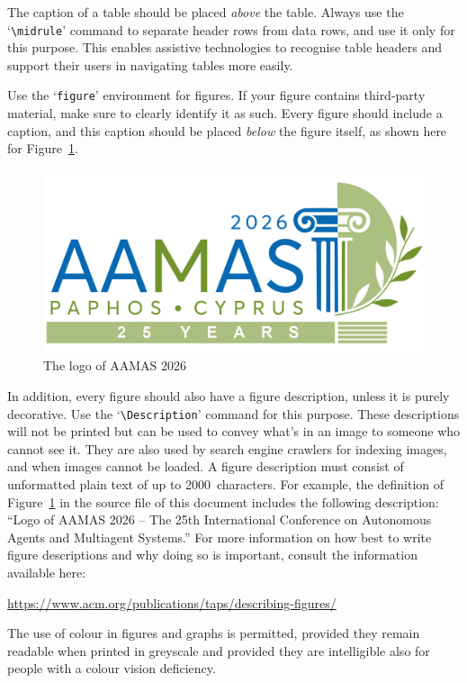 \documentclass[sigconf,anonymous]{aamas}
\begin{document}
The caption of a table should be placed \emph{above} the table. 
Always use the `\verb|\midrule|' command to separate header rows from 
data rows, and use it only for this purpose. This enables assistive 
technologies to recognise table headers and support their users in 
navigating tables more easily.

\balance

Use the `\texttt{figure}' environment for figures. If your figure 
contains third-party material, make sure to clearly identify it as such.
Every figure should include a caption, and this caption should be placed 
\emph{below} the figure itself, as shown here for Figure~\ref{fig:logo}.

\begin{figure}[h]
  \centering
  \includegraphics[width=0.75\linewidth]{aamas2026logo}
  \caption{The logo of AAMAS 2026}
  \label{fig:logo}
\end{figure}

In addition, every figure should also have a figure description, unless
it is purely decorative. Use the `\verb|\Description|' command for this 
purpose. These descriptions will not be printed but can be used to 
convey what's in an image to someone who cannot see it. They are also 
used by search engine crawlers for indexing images, and when images 
cannot be loaded. A figure description must consist of unformatted plain 
text of up to 2000~characters. For example, the definition of 
Figure~\ref{fig:logo} in the source file of this document includes the 
following description: ``Logo of AAMAS 2026 -- The 25th International Conference on Autonomous Agents and Multiagent Systems.'' For more information on how best to write figure descriptions 
and why doing so is important, consult the information available here: 
%
\begin{center}
\url{https://www.acm.org/publications/taps/describing-figures/}
\end{center}
%
The use of colour in figures and graphs is permitted, provided they 
remain readable when printed in greyscale and provided they are 
intelligible also for people with a colour vision deficiency.
\end{document}

